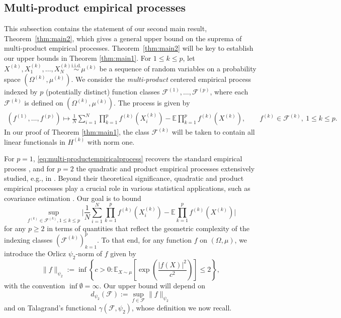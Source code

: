 \documentclass[numbers,webpdf,imaiai]{ima-authoring-template}
\theoremstyle{thmstyletwo}%
\numberwithin{equation}{section}
\numberwithin{equation}{section}
\newcommand{\F}{\mathcal{F}}
\newcommand{\iid}{\stackrel{\text{i.i.d.}}{\sim}}
\newcommand{\E}{\mathbb{E}}
\newcommand{\mcF}{\mathcal{F}}
\newcommand{\inparen}[1]{\left(#1\right)}             %
\newcommand{\insquare}[1]{\left[#1\right]}             %
\begin{document}
\subsection{Multi-product empirical processes}\label{subsec:multi-product}
This subsection contains the statement of our second main result, Theorem~\ref{thm:main2}, which gives a general upper bound on the suprema of multi-product empirical processes. Theorem~\ref{thm:main2} will be key to establish our upper bounds in Theorem \ref{thm:main1}. For $1\le k\le p$, let $X^{(k)}, X^{(k)}_1, \ldots, X^{(k)}_N \iid \mu^{(k)}$ be a sequence of random variables on a probability space $(\Omega^{(k)}, \mu^{(k)})$. We consider the \emph{multi-product} centered empirical process indexed by $p$ (potentially distinct) function classes $\F^{(1)},\ldots,\F^{(p)}$, where each $\F^{(k)}$ is defined on $(\Omega^{(k)}, \mu^{(k)})$. The process is given by 
\begin{align}\label{eq:multi-productempiricalprocess}
 (f^{(1)},\ldots,f^{(p)})\mapsto \frac{1}{N}\sum_{i=1}^N \prod_{k=1}^p f^{(k)}(X^{(k)}_i)-\E \prod_{k=1}^p f^{(k)}(X^{(k)}),\qquad f^{(k)}\in \F^{(k)}, \ 1\le k\le p.
\end{align}
In our proof of Theorem \ref{thm:main1}, the class $\F^{(k)}$ will be taken to contain all linear functionals in $H^{(k)}$ with norm one. 

For $p = 1$, \eqref{eq:multi-productempiricalprocess} recovers the standard empirical process \cite{van2023weak, talagrand2022upper}, and for $p = 2$ the quadratic and product empirical processes extensively studied, e.g., in \cite{rudelson1999random,klartag2005empirical,mendelson2007reconstruction,adamczak2010quantitative,mendelson2010empirical,mendelson2012generic,dirksen2015tail,bednorz2014,mendelson2016upper,bednorz2016bounds, koltchinskii2017concentration,han2022exact}. Beyond their theoretical significance, quadratic and product empirical processes play a crucial role in various statistical applications, such as covariance estimation \cite{koltchinskii2017concentration}. Our goal is to bound
\[
\sup_{f^{(k)} \in \mathcal{F}^{(k)},1\le k\le p}\bigg|\frac{1}{N} \sum_{i=1}^N \prod_{k=1}^p f^{(k)} (X^{(k)}_i)-\mathbb{E} \prod_{k=1}^p f^{(k)} (X^{(k)})\bigg|
\]
for any $p\ge 2$ in terms of quantities that reflect the geometric complexity of the indexing classes $(\F^{(k)})_{k=1}^{p}.$ To that end,  for any function $f$ on $(\Omega, \mu)$, we introduce the Orlicz $\psi_2$-norm of $f$ given by
\[
\|f\|_{\psi_2}:=\inf \left\{c>0: 
\mathbb{E}_{X \sim \mu}\insquare{ \exp \inparen{\frac{|f(X)|^2}{c^2}}} \leq 2\right\},
\]
with the convention $\inf \emptyset = \infty.$ 
Our upper bound will depend on 
\[
d_{\psi_2}(\F) := \sup_{f \in \F}\|f\|_{\psi_2}
\]
and on Talagrand's functional $\gamma(\mcF, \psi_2)$, whose definition we now recall.
\end{document}
